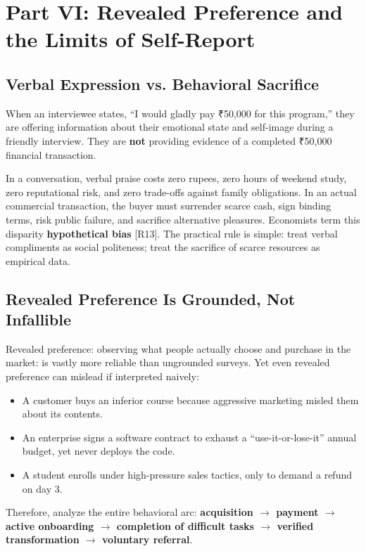 \section{Part VI: Revealed Preference and the Limits of Self-Report}

\subsection{Verbal Expression vs. Behavioral Sacrifice}

When an interviewee states, ``I would gladly pay ₹50,000 for this program,'' they are offering information about their emotional state and self-image during a friendly interview. They are \textbf{not} providing evidence of a completed ₹50,000 financial transaction.

In a conversation, verbal praise costs zero rupees, zero hours of weekend study, zero reputational risk, and zero trade-offs against family obligations. In an actual commercial transaction, the buyer must surrender scarce cash, sign binding terms, risk public failure, and sacrifice alternative pleasures. Economists term this disparity \textbf{hypothetical bias} [R13]. The practical rule is simple: treat verbal compliments as social politeness; treat the sacrifice of scarce resources as empirical data.

\subsection{Revealed Preference Is Grounded, Not Infallible}

Revealed preference: observing what people actually choose and purchase in the market: is vastly more reliable than ungrounded surveys. Yet even revealed preference can mislead if interpreted naively:
\begin{itemize}[leftmargin=1.2em,itemsep=0.2ex]
  \item A customer buys an inferior course because aggressive marketing misled them about its contents.
  \item An enterprise signs a software contract to exhaust a ``use-it-or-lose-it'' annual budget, yet never deploys the code.
  \item A student enrolls under high-pressure sales tactics, only to demand a refund on day 3.
\end{itemize}
Therefore, analyze the entire behavioral arc: \textbf{acquisition $\rightarrow$ payment $\rightarrow$ active onboarding $\rightarrow$ completion of difficult tasks $\rightarrow$ verified transformation $\rightarrow$ voluntary referral}.

